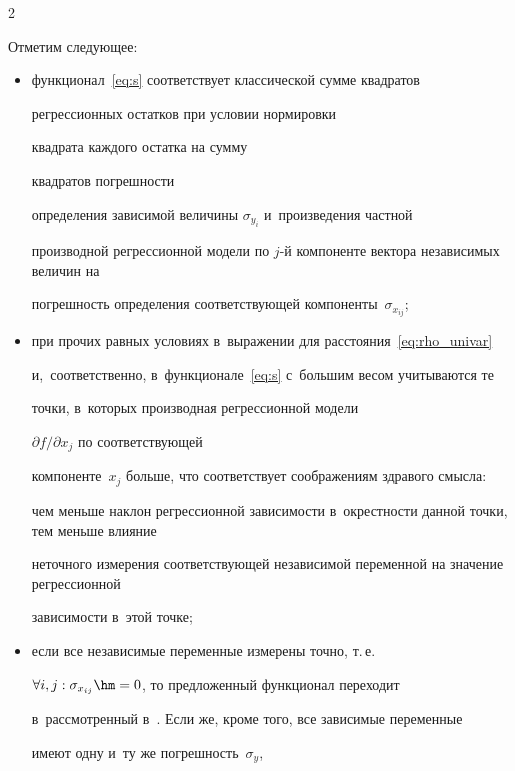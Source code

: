 \begin{multicols}{2}
\begin{equation}
  \label{eq:s}

\end{equation}



Отметим следующее:

\begin{itemize}

  \item функционал~\eqref{eq:s} соответствует классической сумме квад\-ра\-тов 

регрессионных     остат\-ков при условии нормировки 

квад\-ра\-та каждого остатка на сумму 

квад\-ра\-тов по\-греш\-ности

    определения зависимой величины $\sigma_{y_i}$ и~произведения част\-ной 

производной     регрессионной модели по \mbox{$j$-й} компоненте вектора независимых величин на 

по\-греш\-ность     определения соответствующей компоненты~$\sigma_{x_{ij}}$;



  \item при прочих равных условиях в~выражении для расстояния~\eqref{eq:rho_univar} 

  и,~соответственно, в~функционале~\eqref{eq:s} с~большим весом учитываются те 

точ\-ки, в~которых производная регрессионной модели 

${\partial f}/{\partial x_j}$ по  соответствующей

    компоненте~$x_j$ больше, что соответствует соображениям здравого смысла: 

чем меньше наклон регрессионной зависимости в~окрест\-ности данной точки, тем меньше влияние 

неточного измерения соответствующей независимой переменной на значение регрессионной 

зависимости в~этой точке;



  \item если все независимые переменные измерены точно, т.\,е.\

    $\forall i, j : \sigma_{x_{ij}} \hm= 0$, то предложенный функционал переходит 

в~рассмотренный в~\cite{jukic2013nonlinear}. Если же, кроме того, все зависимые переменные 

имеют одну и~ту  же по\-греш\-ность~$\sigma_y$,


\end{itemize}
\end{multicols}
